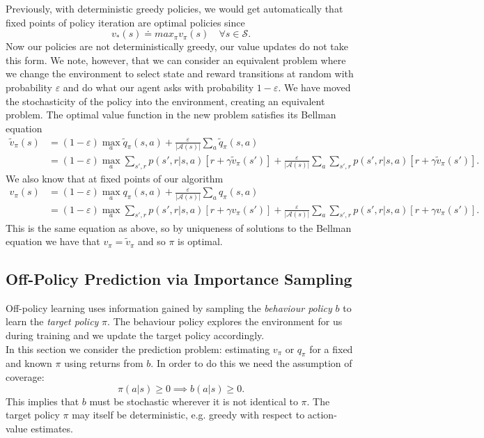 Previously, with deterministic greedy policies, we would get automatically that fixed points of policy iteration are optimal policies since
\[
    v_*(s) \doteq max_\pi v_\pi(s) \quad \forall s \in \mathcal{S}.
\]
Now our policies are not deterministically greedy, our value updates do not take this form. We note, however, that we can consider an equivalent problem where we change the environment to select state and reward transitions at random with probability $\varepsilon$ and do what our agent asks with probability $1 - \varepsilon$. We have moved the stochasticity of the policy into the environment, creating an equivalent problem. The optimal value function in the new problem satisfies its Bellman equation
\begin{align}
    \tilde{v}_\pi(s) &= (1 - \varepsilon) \max_a \tilde{q}_\pi(s, a) + \frac{\varepsilon}{|\mathcal{A}(s)|}\sum_a \tilde{q}_\pi(s, a) \\ 
                     &= (1 - \varepsilon) \max_a \sum_{s', r} p(s', r|s, a)[r + \gamma \tilde{v}_\pi(s')] + \frac{\varepsilon}{|\mathcal{A}(s)|} \sum_a \sum_{s', r} p(s', r|s, a)[r + \gamma \tilde{v}_\pi(s')].
\end{align}
We also know that at fixed points of our algorithm
\begin{align}
    v_\pi(s) &= (1 - \varepsilon) \max_a q_\pi(s, a) + \frac{\varepsilon}{|\mathcal{A}(s)|}\sum_a q_\pi(s, a) \\ 
                     &= (1 - \varepsilon) \max_a \sum_{s', r} p(s', r|s, a)[r + \gamma v_\pi(s')] + \frac{\varepsilon}{|\mathcal{A}(s)|} \sum_a \sum_{s', r} p(s', r|s, a)[r + \gamma v_\pi(s')].
\end{align}
This is the same equation as above, so by uniqueness of solutions to the Bellman equation we have that $v_\pi = \tilde{v}_\pi$ and so $\pi$ is optimal.

\subsection{Off-Policy Prediction via Importance Sampling}
Off-policy learning uses information gained by sampling the \emph{behaviour policy} $b$ to learn the \emph{target policy} $\pi$. The behaviour policy explores the environment for us during training and we update the target policy accordingly.\\

In this section we consider the prediction problem: estimating $v_\pi$ or $q_\pi$ for a fixed and known $\pi$ using returns from $b$. In order to do this we need the assumption of coverage:
\begin{equation}
    \pi(a|s) \geq 0 \implies b(a|s) \geq 0.
\end{equation}
This implies that $b$ must be stochastic wherever it is not identical to $\pi$. The target policy $\pi$ may itself be deterministic, e.g. greedy with respect to action-value estimates.

